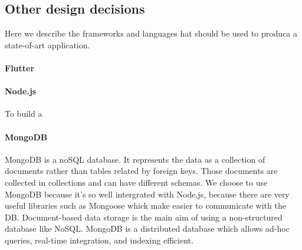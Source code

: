 \subsection{Other design decisions}
Here we describe the frameworks and languages hat should be used to produca a state-of-art application.

\paragraph{Flutter}


\paragraph{Node.js}
To build a

\paragraph{MongoDB}
MongoDB is a noSQL database. It represents the data as a collection of documents rather than tables related by foreign keys. Those documents are collected in collections and can have different schemas. We choose to use MongoDB because it's so well intergrated with Node.js, because there are very useful libraries such as Mongoose whick make easier to communicate with the DB. Document-based data storage is the main aim of using a non-structured database like NoSQL. MongoDB is a distributed database which allows ad-hoc queries, real-time integration, and indexing efficient.
